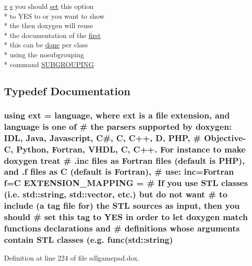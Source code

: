 \begin{DoxyCompactItemize}
\item 
\hyperlink{glext_8h_a14cfbe2fc2234f5504618905b69d1e06}{v} \hyperlink{glext_8h_ad585a1393cfa368fa9dc3d8ebff640d5}{s} you should \hyperlink{analyze_raw_8m_a11671e12e7b3fc5881313758d6cc0b45}{set} this option \\*
to Y\-E\-S to or you want to show \\*
the then doxygen will reuse \\*
the documentation of the \hyperlink{glext_8h_a970a385f6f880f2b620451db4ca4299a}{first} \\*
this can be \hyperlink{qxtslotjob_8h_afd848a85523ad0ba77464879add9c332}{done} per class \\*
using the nosubgrouping \\*
command \hyperlink{sdlgamepad_8dox_ae6985312f7898cf37a90edd149dbd7fc}{S\-U\-B\-G\-R\-O\-U\-P\-I\-N\-G}
\end{DoxyCompactItemize}


\subsection{Typedef Documentation}
\hypertarget{sdlgamepad_8dox_a6a79297c84f6ac85847cdc8c89676bff}{
\subsubsection[{ext}]{\setlength{\rightskip}{0pt plus 5cm}using {\bf ext} =  language, where {\bf ext} is {\bf a} {\bf file} extension, and language is one of \# the parsers supported {\bf by} doxygen\-: I\-D\-L, Java, Javascript, C\#, C, C++, D, P\-H\-P, \# Objective-\/C, Python, Fortran, V\-H\-D\-L, C, C++. For instance to make doxygen treat \# .inc files as Fortran files (default is P\-H\-P), and .f files as C (default is Fortran), \# use\-: inc=Fortran f=C E\-X\-T\-E\-N\-S\-I\-O\-N\-\_\-\-M\-A\-P\-P\-I\-N\-G = \# If you use S\-T\-L classes (i.\-e. {\bf std\-::string}, std\-::vector, etc.) but do {\bf not} want \# to include ({\bf a} tag {\bf file} {\bf for}) the S\-T\-L sources as {\bf input}, then you should \# {\bf set} this tag to Y\-E\-S {\bf in} order to let doxygen match functions declarations and \# definitions whose arguments contain S\-T\-L classes (e.\-g. func({\bf std\-::string})}}\label{sdlgamepad_8dox_a6a79297c84f6ac85847cdc8c89676bff}


Definition at line 224 of file sdlgamepad.\-dox.



